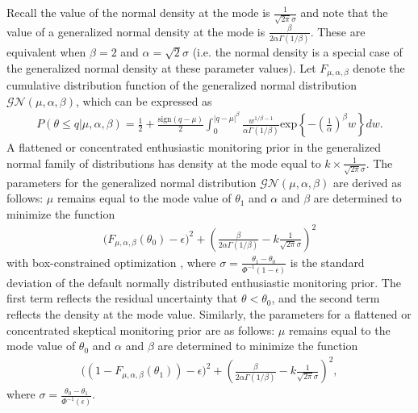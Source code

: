 \documentclass[12pt]{article}
\begin{document}
Recall the value of the normal density at the mode is $\frac{1}{\sqrt{2\pi}\sigma}$ and note that the value of a generalized normal density at the mode is $\frac{\beta}{2\alpha\Gamma(1/\beta)}$. These are equivalent when $\beta=2$ and $\alpha=\sqrt{2}\sigma$ (i.e. the normal density is a special case of the generalized normal density at these parameter values). Let $F_{\mu,\alpha,\beta}$ denote the cumulative distribution function of the generalized normal distribution $\mathcal{GN}(\mu,\alpha,\beta)$, which can be expressed as \citep{Griffin2018}
\begin{align*}
P(\theta\leq q|\mu,\alpha,\beta)=\frac{1}{2}+\frac{\text{sign}(q-\mu)}{2}\int_0^{|q-\mu|^\beta}\frac{w^{1/\beta-1}}{\alpha\Gamma(1/\beta)}\text{exp}\left\{-\left(\frac{1}{\alpha}\right)^\beta w\right\} dw.
\end{align*}
%
A flattened or concentrated enthusiastic monitoring prior in the generalized normal family of distributions has density at the mode equal to $k\times \frac{1}{\sqrt{2\pi}\sigma}$. 
%
The parameters for the generalized normal distribution $\mathcal{GN}(\mu,\alpha,\beta)$ are derived as follows: $\mu$ remains equal to the mode value of $\theta_1$ and $\alpha$ and $\beta$ are determined to minimize the function 
\begin{align*}
\bigg(F_{\mu,\alpha,\beta}(\theta_0)-\epsilon\bigg)^2+\left(\frac{\beta}{2\alpha\Gamma(1/\beta)}-k \frac{1}{\sqrt{2\pi}\sigma}\right)^2
\end{align*} with box-constrained optimization \citep{Byrd1995}, where $\sigma=\frac{\theta_1-\theta_0}{\Phi^{-1}(1-\epsilon)}$ is the standard deviation of the default normally distributed enthusiastic monitoring prior. The first term reflects the residual uncertainty that $\theta<\theta_0$, and the second term reflects the density at the mode value. Similarly, the parameters for a flattened or concentrated skeptical monitoring prior are as follows: $\mu$ remains equal to the mode value of $\theta_0$ and $\alpha$ and $\beta$ are determined to minimize the function 
\begin{align*}
\bigg((1-F_{\mu,\alpha,\beta}(\theta_1))-\epsilon\bigg)^2+\left(\frac{\beta}{2\alpha\Gamma(1/\beta)}-k \frac{1}{\sqrt{2\pi}\sigma}\right)^2,
\end{align*} 
where $\sigma=\frac{\theta_0-\theta_1}{\Phi^{-1}(\epsilon)}$.
%
\end{document}

